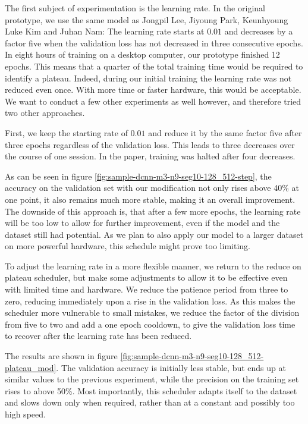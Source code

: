 The first subject of experimentation is the learning rate. In the original prototype, we use the same model as Jongpil Lee, Jiyoung Park, Keunhyoung Luke Kim and Juhan Nam: The learning rate starts at $0.01$ and decreases by a factor five when the validation loss has not decreased in three consecutive epochs. In eight hours of training on a desktop computer, our prototype finished 12 epochs. This means that a quarter of the total training time would be required to identify a plateau. Indeed, during our initial training the learning rate was not reduced even once. With more time or faster hardware, this would be acceptable. We want to conduct a few other experiments as well however, and therefore tried two other approaches.

First, we keep the starting rate of $0.01$ and reduce it by the same factor five after three epochs regardless of the validation loss. This leads to three decreases over the course of one session. In the paper, training was halted after four decreases.

As can be seen in figure \ref{fig:sample-dcnn-m3-n9-seg10-128_512-step}, the accuracy on the validation set with our modification not only rises above 40\% at one point, it also remains much more stable, making it an overall improvement. The downside of this approach is, that after a few more epochs, the learning rate will be too low to allow for further improvement, even if the model and the dataset still had potential. As we plan to also apply our model to a larger dataset on more powerful hardware, this schedule might prove too limiting.

To adjust the learning rate in a more flexible manner, we return to the reduce on plateau scheduler, but make some adjustments to allow it to be effective even with limited time and hardware. We reduce the patience period from three to zero, reducing immediately upon a rise in the validation loss. As this makes the scheduler more vulnerable to small mistakes, we reduce the factor of the division from five to two and add a one epoch cooldown, to give the validation loss time to recover after the learning rate has been reduced.

The results are shown in figure \ref{fig:sample-dcnn-m3-n9-seg10-128_512-plateau_mod}. The validation accuracy is initially less stable, but ends up at similar values to the previous experiment, while the precision on the training set rises to above 50\%. Most importantly, this scheduler adapts itself to the dataset and slows down only when required, rather than at a constant and possibly too high speed.


